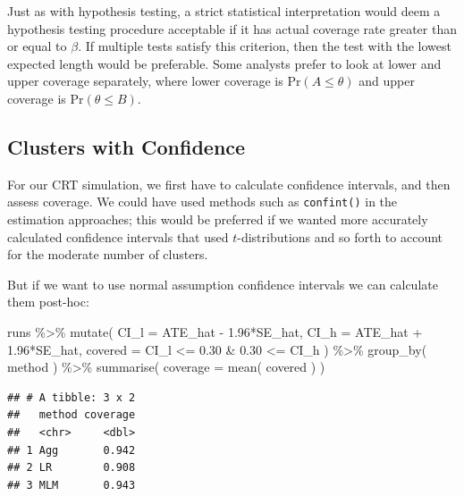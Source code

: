 \documentclass[
]{book}
\newenvironment{Shaded}{\begin{snugshade}}{\end{snugshade}}
\newcommand{\AttributeTok}[1]{\textcolor[rgb]{0.77,0.63,0.00}{#1}}
\newcommand{\FloatTok}[1]{\textcolor[rgb]{0.00,0.00,0.81}{#1}}
\newcommand{\FunctionTok}[1]{\textcolor[rgb]{0.00,0.00,0.00}{#1}}
\newcommand{\NormalTok}[1]{#1}
\newcommand{\SpecialCharTok}[1]{\textcolor[rgb]{0.00,0.00,0.00}{#1}}
\begin{document}
Just as with hypothesis testing, a strict statistical interpretation would deem a hypothesis testing procedure acceptable if it has actual coverage rate greater than or equal to \(\beta\).
If multiple tests satisfy this criterion, then the test with the lowest expected length would be preferable. Some analysts prefer to look at lower and upper coverage separately, where lower coverage is \(\text{Pr}(A \leq \theta)\) and upper coverage is \(\text{Pr}(\theta \leq B)\).

\hypertarget{clusters-with-confidence}{%
\subsection{Clusters with Confidence}\label{clusters-with-confidence}}

For our CRT simulation, we first have to calculate confidence intervals, and then assess coverage.
We could have used methods such as \texttt{confint()} in the estimation approaches; this would be preferred if we wanted more accurately calculated confidence intervals that used \(t\)-distributions and so forth to account for the moderate number of clusters.

But if we want to use normal assumption confidence intervals we can calculate them post-hoc:

\begin{Shaded}
\begin{Highlighting}[]
\NormalTok{runs }\SpecialCharTok{\%\textgreater{}\%} \FunctionTok{mutate}\NormalTok{( }\AttributeTok{CI\_l =}\NormalTok{ ATE\_hat }\SpecialCharTok{{-}} \FloatTok{1.96}\SpecialCharTok{*}\NormalTok{SE\_hat,}
                 \AttributeTok{CI\_h =}\NormalTok{ ATE\_hat }\SpecialCharTok{+} \FloatTok{1.96}\SpecialCharTok{*}\NormalTok{SE\_hat,}
                 \AttributeTok{covered =}\NormalTok{ CI\_l }\SpecialCharTok{\textless{}=} \FloatTok{0.30} \SpecialCharTok{\&} \FloatTok{0.30} \SpecialCharTok{\textless{}=}\NormalTok{ CI\_h ) }\SpecialCharTok{\%\textgreater{}\%}
  \FunctionTok{group\_by}\NormalTok{( method ) }\SpecialCharTok{\%\textgreater{}\%}
  \FunctionTok{summarise}\NormalTok{( }\AttributeTok{coverage =} \FunctionTok{mean}\NormalTok{( covered ) )}
\end{Highlighting}
\end{Shaded}

\begin{verbatim}
## # A tibble: 3 x 2
##   method coverage
##   <chr>     <dbl>
## 1 Agg       0.942
## 2 LR        0.908
## 3 MLM       0.943
\end{verbatim}
\end{document}
